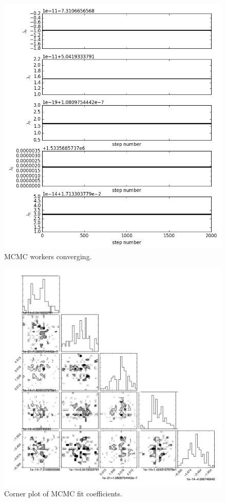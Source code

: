 \begin{figure}[ht]
  \includegraphics[width=\columnwidth]{img/line-time.png}
  \caption{MCMC workers converging.}
  \label{fig:MCMC_time}
\end{figure}

\begin{figure}[ht]
  \includegraphics[width=\columnwidth]{img/line-triangle.jpg}
  \caption{Corner plot of MCMC fit coefficients.}
  \label{fig:MCMC_triangle}
\end{figure}

